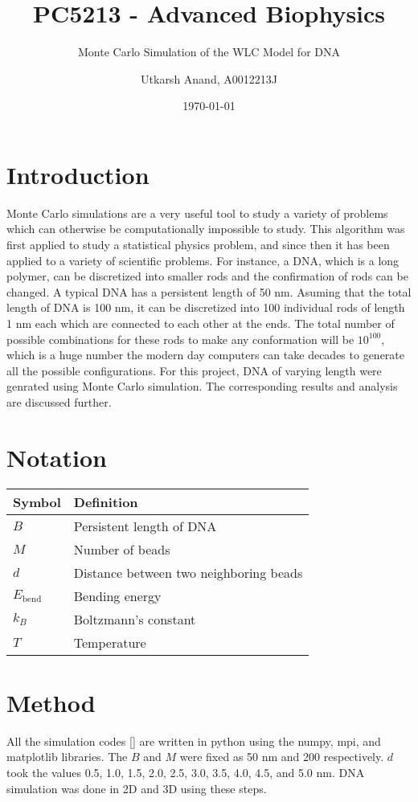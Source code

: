 \documentclass{scrartcl}
\author{Utkarsh Anand, A0012213J}
\title{PC5213 - Advanced Biophysics}
\subtitle{Monte Carlo Simulation of the WLC Model for DNA}
\date{\today}
\begin{document}
\maketitle

\section{Introduction}
\label{introduction}
Monte Carlo simulations are a very useful tool to study a variety of problems which can otherwise be computationally impossible to study. This algorithm was first applied to study a statistical physics problem, and since then it has been applied to a variety of scientific problems. For instance, a DNA, which is a long polymer, can be discretized into smaller rods and the confirmation of rods can be changed. A typical DNA has a persistent length of 50 nm. Asuming that the total length of DNA is 100 nm, it can be discretized into 100 individual rods of length 1 nm each which are connected to each other at the ends. The total number of possible combinations for these rods to make any conformation will be $10^{100}$, which is a huge number the modern day computers can take decades to generate all the possible configurations. For this project, DNA of varying length were genrated using Monte Carlo simulation. The corresponding results and analysis are discussed further.

\section{Notation}
\label{notation}
\begin{tabular}{|l|l|}
\hline
\textbf{Symbol} & \textbf{Definition}\\
\hline
$B$ & Persistent length of DNA\\
$M$ & Number of beads\\
$d$ & Distance between two neighboring beads\\
$E_{\textrm{bend}}$ & Bending energy\\
$k_B$ & Boltzmann's constant\\
$T$ & Temperature\\
\hline
\end{tabular}

\section{Method}
\label{method}
All the simulation codes \ref{} are written in python using the numpy, mpi, and matplotlib libraries. The $B$ and $M$ were fixed as 50 nm and 200 respectively. $d$ took the values 0.5, 1.0, 1.5, 2.0, 2.5, 3.0, 3.5, 4.0, 4.5, and 5.0 nm. DNA simulation was done in 2D and 3D using these steps.
\end{document}
